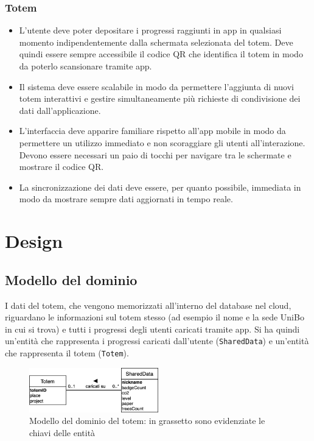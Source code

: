 \subsubsection{Totem}
\begin{itemize}
    \item L'utente deve poter depositare i progressi raggiunti in app in qualsiasi momento indipendentemente dalla schermata selezionata del totem. Deve quindi essere sempre accessibile il codice QR che identifica il totem in modo da poterlo scansionare tramite app.
    \item Il sistema deve essere scalabile in modo da permettere l'aggiunta di nuovi totem interattivi e gestire simultaneamente più richieste di condivisione dei dati dall'applicazione.
    \item L'interfaccia deve apparire familiare rispetto all'app mobile in modo da permettere un utilizzo immediato e non scoraggiare gli utenti all'interazione. Devono essere necessari un paio di tocchi per navigare tra le schermate e mostrare il codice QR.
    \item La sincronizzazione dei dati deve essere, per quanto possibile, immediata in modo da mostrare sempre dati aggiornati in tempo reale.
\end{itemize}
%
%
%
%
\section{Design}
\subsection{Modello del dominio}
I dati del totem, che vengono memorizzati all'interno del database nel cloud, riguardano le informazioni sul totem stesso (ad esempio il nome e la sede UniBo in cui si trova) e tutti i progressi degli utenti caricati tramite app.
Si ha quindi un'entità che rappresenta i progressi caricati dall'utente (\texttt{SharedData}) e un'entità che rappresenta il totem (\texttt{Totem}).
\begin{figure}[h!]
    \centering
    \includegraphics[width=0.5\textwidth]{img/totem/totemDomain.png}
    \caption[Modello del dominio del totem]{Modello del dominio del totem: in grassetto sono evidenziate le chiavi delle entità}
    \label{fig:totemDomain}
\end{figure}
